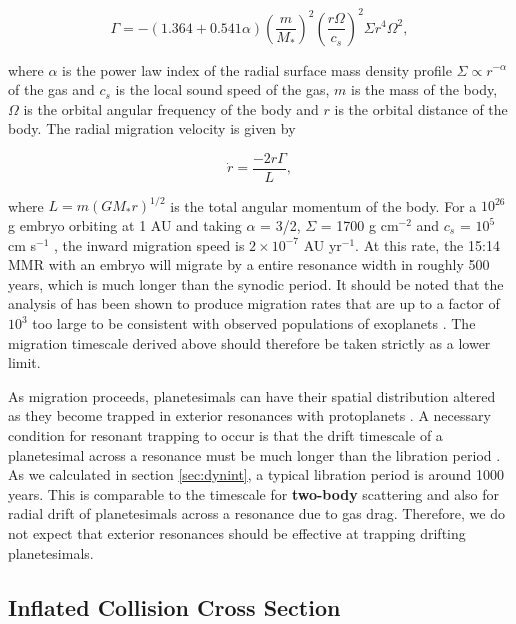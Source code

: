 \begin{equation}\label{eq:t1mig_torque}
     \Gamma = -\left( 1.364 + 0.541 \alpha \right) \left (\frac{m}{M_{*}} \right)^{2} \left( \frac{r \Omega}{c_{s}} \right)^{2} \Sigma r^{4} \Omega^{2},
\end{equation}

\noindent where $\alpha$ is the power law index of the radial surface mass density profile $\Sigma \propto r^{-\alpha}$ of the gas 
and $c_{s}$ is the local sound speed of the gas, $m$ is the mass of the body, $\Omega$ is the orbital angular frequency of the 
body and $r$ is the orbital distance of the body. The radial migration velocity is given by

\begin{equation}\label{eq:t1mig_rate}
    \dot{r} = \frac{-2 r \Gamma}{L},
\end{equation}

\noindent where $L = m \left( G M_{*} r \right)^{1/2}$ is the total angular momentum of the body. For a $10^{26}$ g embryo 
orbiting at 1 AU and taking $\alpha$ = 3/2, $\Sigma$ = 1700 g cm$^{-2}$ and $c_{s}$ = $10^{5}$ cm s$^{-1}$ \cite{hayashi81}, 
the inward migration speed is $2 \times 10^{-7}$ AU yr$^{-1}$. At this rate, the 15:14 MMR with an embryo will migrate by a 
entire resonance width in roughly 500 years, which is much longer than the synodic period. It should be noted that the analysis 
of \cite{tanaka02} has been shown to produce migration rates that are up to a factor of $10^{3}$ too large to be consistent with 
observed populations of exoplanets \cite{ida04, alibert05, miguel11}. The migration timescale derived above should therefore 
be taken strictly as a lower limit.

As migration proceeds, planetesimals can have their spatial distribution altered as they become trapped in exterior resonances 
with protoplanets \cite{weidenschilling85}. A necessary condition for resonant trapping to occur is that the drift timescale of a 
planetesimal across a resonance must be much longer than the libration period \cite{dermott88}. As we calculated in section 
\ref{sec:dynint}, a typical libration period is around 1000 years. This is comparable to the timescale for \textbf{two-body} 
scattering and also for radial drift of planetesimals across a resonance due to gas drag. Therefore, we do not expect that exterior 
resonances should be effective at trapping drifting planetesimals.

\subsection{Inflated Collision Cross Section}

